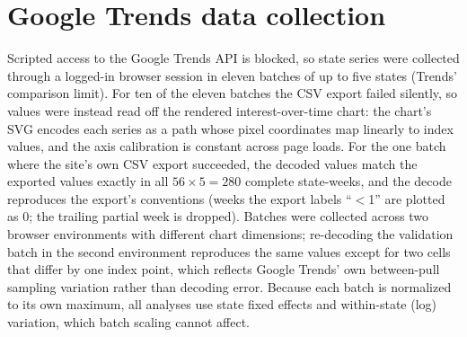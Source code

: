 \documentclass[12pt]{article}
\begin{document}
\appendix

\section{Google Trends data collection}
\label{app:trends}

Scripted access to the Google Trends API is blocked, so state series were collected through a logged-in browser session in eleven batches of up to five states (Trends' comparison limit). For ten of the eleven batches the CSV export failed silently, so values were instead read off the rendered interest-over-time chart: the chart's SVG encodes each series as a path whose pixel coordinates map linearly to index values, and the axis calibration is constant across page loads. For the one batch where the site's own CSV export succeeded, the decoded values match the exported values exactly in all $56 \times 5 = 280$ complete state-weeks, and the decode reproduces the export's conventions (weeks the export labels ``$<$1'' are plotted as 0; the trailing partial week is dropped). Batches were collected across two browser environments with different chart dimensions; re-decoding the validation batch in the second environment reproduces the same values except for two cells that differ by one index point, which reflects Google Trends' own between-pull sampling variation rather than decoding error. Because each batch is normalized to its own maximum, all analyses use state fixed effects and within-state (log) variation, which batch scaling cannot affect.
\end{document}
